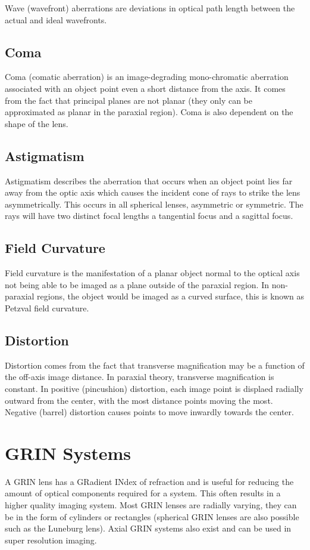 \documentclass[12pt]{report}
\begin{document}
Wave (wavefront) aberrations are deviations in optical path length between the actual and ideal wavefronts.

\subsection{Coma}
Coma (comatic aberration) is an image-degrading mono-chromatic aberration associated with an object point even a short distance from the axis. It comes from the fact that principal planes are not planar (they only can be approximated as planar in the paraxial region). Coma is also dependent on the shape of the lens. 

\subsection{Astigmatism}
Astigmatism describes the aberration that occurs when an object point lies far away from the optic axis which causes the incident cone of rays to strike the lens asymmetrically. This occurs in all spherical lenses, asymmetric or symmetric. The rays will have two distinct focal lengths a tangential focus and a sagittal focus. 

\subsection{Field Curvature}
Field curvature is the manifestation of a planar object normal to the optical axis not being able to be imaged as a plane outside of the paraxial region. In non-paraxial regions, the object would be imaged as a curved surface, this is known as Petzval field curvature. 

\subsection{Distortion}
Distortion comes from the fact that transverse magnification may be a function of the off-axis image distance. In paraxial theory, transverse magnification is constant. In positive (pincushion) distortion, each image point is displaed radially outward from the center, with the most distance points moving the most. Negative (barrel) distortion causes points to move inwardly towards the center. 

\section{GRIN Systems}
A GRIN lens has a GRadient INdex of refraction and is useful for reducing the amount of optical components required for a system. This often results in a higher quality imaging system. Most GRIN lenses are radially varying, they can be in the form of cylinders or rectangles (spherical GRIN lenses are also possible such as the Luneburg lens). Axial GRIN systems also exist and can be used in super resolution imaging. 
\end{document}

